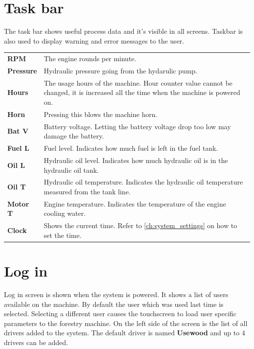 \documentclass[12pt,a4paper,english]{uvmanual}
\begin{document}
\chapter{Task bar}\label{ch:taskbar}
The task bar shows useful process data and it's visible in all screens. Taskbar is also used to display warning and error messages to the user.


\begin{tabular}{ L{0.2\textwidth} L{0.66\textwidth} }
\textbf{RPM} & The engine rounds per minute. \\
\textbf{Pressure} & Hydraulic pressure going from the hydarulic pump. \\
\textbf{Hours} & The usage hours of the machine. Hour counter value cannot be changed, it is increased all the time when the machine is powered on. \\
\textbf{Horn} & Pressing this blows the machine horn. \\
\textbf{Bat V} & Battery voltage. Letting the battery voltage drop too low may damage the battery. \\
\textbf{Fuel L} & Fuel level. Indicates how much fuel is left in the fuel tank. \\
\textbf{Oil L} & Hydraulic oil level. Indicates how much hydraulic oil is in the hydraulic oil tank. \\
\textbf{Oil T} & Hydraulic oil temperature. Indicates the hydraulic oil temperature measured from the tank line. \\
\textbf{Motor T} & Engine temperature. Indicates the temperature of the engine cooling water. \\
\textbf{Clock} & Shows the current time. Refer to \autoref{ch:system_settings} on how to set the time. \\
\end{tabular}


\chapter{Log in}\label{ch:login}

Log in screen is shown when the system is powered. It shows a list of users available on the machine. By default the user which was used last time is selected. Selecting a different user causes the touchscreen to load user specific parameters to the forestry machine. On the left side of the screen is the list of all drivers added to the system. The default driver is named \textbf{Usewood} and up to 4 drivers can be added.
\end{document}
